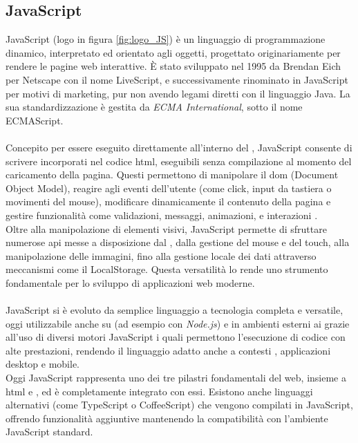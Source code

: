 \subsection{JavaScript}
\label{subsec:js}
\noindent JavaScript (logo in figura \ref{fig:logo_JS}) è un linguaggio di programmazione dinamico, interpretato ed orientato agli oggetti, progettato originariamente per rendere le pagine web interattive.
È stato sviluppato nel 1995 da Brendan Eich per Netscape con il nome LiveScript, e successivamente rinominato in JavaScript per motivi di marketing, pur non avendo legami diretti con il linguaggio Java. La sua standardizzazione è gestita da \textit{ECMA International}, sotto il nome ECMAScript.\\
\\
Concepito per essere eseguito direttamente all’interno del , JavaScript consente di scrivere  incorporati nel codice \acrshort{html}, eseguibili senza compilazione al momento del caricamento della pagina. Questi  permettono di manipolare il \acrshort{dom} (Document Object Model), reagire agli eventi dell’utente (come click, input da tastiera o movimenti del mouse), modificare dinamicamente il contenuto della pagina e gestire funzionalità come validazioni, messaggi, animazioni, e interazioni .\\
Oltre alla manipolazione di elementi visivi, JavaScript permette di sfruttare numerose \acrshort{api} messe a disposizione dal , dalla gestione del mouse e del touch, alla manipolazione delle immagini, fino alla gestione locale dei dati attraverso meccanismi come il LocalStorage. Questa versatilità lo rende uno strumento fondamentale per lo sviluppo di applicazioni web moderne.\\
\\
JavaScript si è evoluto da semplice linguaggio  a tecnologia completa e versatile, oggi utilizzabile anche su  (ad esempio con \textit{Node.js}) e in ambienti esterni ai  grazie all’uso di diversi motori JavaScript i quali permettono l’esecuzione di codice  con alte prestazioni, rendendo il linguaggio adatto anche a contesti , applicazioni desktop e mobile.\\
Oggi JavaScript rappresenta uno dei tre pilastri fondamentali del web, insieme a \acrshort{html} e , ed è completamente integrato con essi. Esistono anche linguaggi alternativi (come TypeScript o CoffeeScript) che vengono compilati in JavaScript, offrendo funzionalità aggiuntive mantenendo la compatibilità con l’ambiente JavaScript standard.
